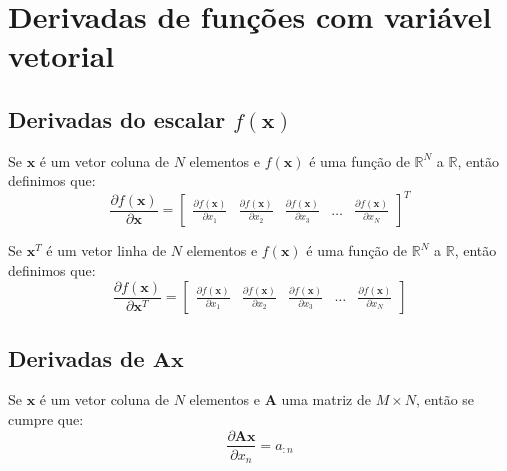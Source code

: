 
\chapter{Derivadas de funções com variável vetorial}

\section{Derivadas do escalar $f(\mathbf{x})$}
\begin{definition}
Se $\mathbf{x}$ é um vetor coluna de $N$ elementos e $f(\mathbf{x})$ é 
uma função de $\mathbb{R}^{N}$ a $\mathbb{R}$, então definimos que:
\begin{equation}
\frac{\partial f(\mathbf{x}) }{\partial \mathbf{x}}= 
\left[
\begin{matrix}
\frac{\partial f(\mathbf{x}) }{\partial x_{1}}&
\frac{\partial f(\mathbf{x}) }{\partial x_{2}}&
\frac{\partial f(\mathbf{x}) }{\partial x_{3}}&
\hdots&
\frac{\partial f(\mathbf{x}) }{\partial x_{N}}
\end{matrix}
\right]^{T}
\end{equation}
\end{definition}

\begin{definition}
Se $\mathbf{x}^{T}$ é um vetor linha de $N$ elementos e $f(\mathbf{x})$ é 
uma função de $\mathbb{R}^{N}$ a $\mathbb{R}$, então definimos que:
\begin{equation}
\frac{\partial f(\mathbf{x}) }{\partial \mathbf{x}^{T}}= 
\left[
\begin{matrix}
\frac{\partial f(\mathbf{x}) }{\partial x_{1}}&
\frac{\partial f(\mathbf{x}) }{\partial x_{2}}&
\frac{\partial f(\mathbf{x}) }{\partial x_{3}}&
\hdots&
\frac{\partial f(\mathbf{x}) }{\partial x_{N}}
\end{matrix}
\right]
\end{equation}
\end{definition}

\section{Derivadas de $\mathbf{A}\mathbf{x}$}

\begin{theorem}
Se $\mathbf{x}$ é um vetor coluna de $N$ elementos e $\mathbf{A}$ uma matriz de $M\times N$, então se cumpre que:
\begin{equation}
\frac{\partial \mathbf{A}\mathbf{x}}{\partial x_n}=a_{:n}
\end{equation}
\end{theorem}

